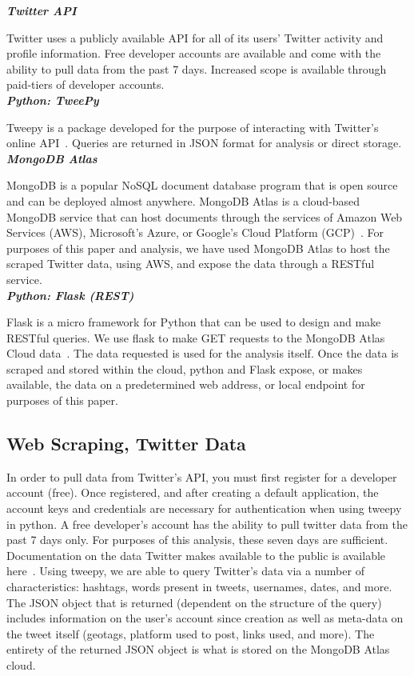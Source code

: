 \textit{\bf   Twitter API}

Twitter uses a publicly available API for all of its users' Twitter activity
and profile information. Free developer accounts are available and come with
the ability to pull data from the past 7 days. Increased scope is available
through paid-tiers of developer accounts.  \\ \textit{\bf Python: TweePy}

Tweepy is a package developed for the purpose of interacting with Twitter's
online API~\cite{PythonTweePy}. Queries are returned in JSON format for
analysis or direct storage.  \\ \textit{\bf MongoDB Atlas}

MongoDB is a popular NoSQL document database program that is open source and
can be deployed almost anywhere. MongoDB Atlas is a cloud-based MongoDB service
that can host documents through the services of Amazon Web Services (AWS),
Microsoft's Azure, or Google's Cloud Platform (GCP)~\cite{MongoDBAtlasPython}.
For purposes of this paper and analysis, we have used MongoDB Atlas to host the
scraped Twitter data, using AWS, and expose the data through a RESTful service.
\\ \textit{\bf Python: Flask (REST)}

Flask is a micro framework for Python that can be used to design and make
RESTful queries. We use flask to make GET requests to the MongoDB Atlas Cloud
data~\cite{MongoDBFlask}. The data requested is used for the analysis itself.
Once the data is scraped and stored within the cloud, python and Flask expose,
or makes available, the data on a predetermined web address, or local endpoint
for purposes of this paper.

\subsection{Web Scraping, Twitter Data}

In order to pull data from Twitter's API, you must first register for a
developer account (free). Once registered, and after creating a default
application, the account keys and credentials are necessary for authentication
when using tweepy in python. A free developer's account has the ability to pull
twitter data from the past 7 days only. For purposes of this analysis, these
seven days are sufficient. Documentation on the data Twitter makes available to
the public is available here~\cite{TwitterAPI}. Using tweepy, we are able to
query Twitter's data via a number of characteristics: hashtags, words present
in tweets, usernames, dates, and more. The JSON object that is returned
(dependent on the structure of the query) includes information on the user's
account since creation as well as meta-data on the tweet itself (geotags,
platform used to post, links used, and more). The entirety of the returned JSON
object is what is stored on the MongoDB Atlas cloud.

